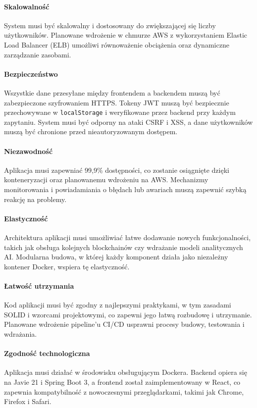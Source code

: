 \paragraph{Skalowalność}
System musi być skalowalny i dostosowany do zwiększającej się liczby użytkowników. Planowane wdrożenie w chmurze AWS z wykorzystaniem Elastic Load Balancer (ELB) umożliwi równoważenie obciążenia oraz dynamiczne zarządzanie zasobami.

\paragraph{Bezpieczeństwo}
Wszystkie dane przesyłane między frontendem a backendem muszą być zabezpieczone szyfrowaniem HTTPS. Tokeny JWT muszą być bezpiecznie przechowywane w \texttt{localStorage} i weryfikowane przez backend przy każdym zapytaniu. System musi być odporny na ataki CSRF i XSS, a dane użytkowników muszą być chronione przed nieautoryzowanym dostępem.

\paragraph{Niezawodność}
Aplikacja musi zapewniać 99,9\% dostępności, co zostanie osiągnięte dzięki konteneryzacji oraz planowanemu wdrożeniu na AWS. Mechanizmy monitorowania i powiadamiania o błędach lub awariach muszą zapewnić szybką reakcję na problemy.

\paragraph{Elastyczność}
Architektura aplikacji musi umożliwiać łatwe dodawanie nowych funkcjonalności, takich jak obsługa kolejnych blockchainów czy wdrażanie modeli analitycznych AI. Modularna budowa, w której każdy komponent działa jako niezależny kontener Docker, wspiera tę elastyczność.

\paragraph{Łatwość utrzymania}
Kod aplikacji musi być zgodny z najlepszymi praktykami, w tym zasadami SOLID i wzorcami projektowymi, co zapewni jego łatwą rozbudowę i utrzymanie. Planowane wdrożenie pipeline'u CI/CD usprawni procesy budowy, testowania i wdrażania.

\paragraph{Zgodność technologiczna}
Aplikacja musi działać w środowisku obsługującym Dockera. Backend opiera się na Javie 21 i Spring Boot 3, a frontend został zaimplementowany w React, co zapewnia kompatybilność z nowoczesnymi przeglądarkami, takimi jak Chrome, Firefox i Safari.


